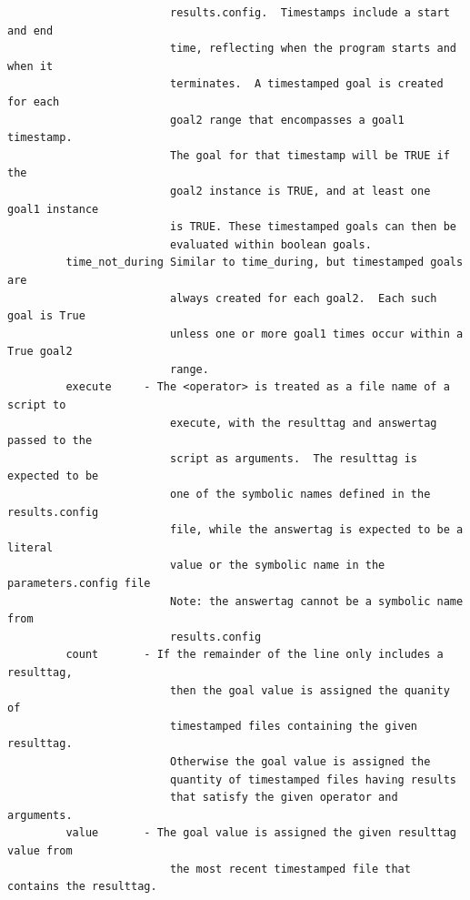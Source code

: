 \documentclass[12pt]{article}
\begin{document}
\begin{verbatim}
                         results.config.  Timestamps include a start and end 
                         time, reflecting when the program starts and when it 
                         terminates.  A timestamped goal is created for each
                         goal2 range that encompasses a goal1 timestamp.
                         The goal for that timestamp will be TRUE if the
                         goal2 instance is TRUE, and at least one goal1 instance
                         is TRUE. These timestamped goals can then be
                         evaluated within boolean goals.
         time_not_during Similar to time_during, but timestamped goals are
                         always created for each goal2.  Each such goal is True
                         unless one or more goal1 times occur within a True goal2
                         range.
         execute     - The <operator> is treated as a file name of a script to 
                         execute, with the resulttag and answertag passed to the 
                         script as arguments.  The resulttag is expected to be 
                         one of the symbolic names defined in the results.config 
                         file, while the answertag is expected to be a literal 
                         value or the symbolic name in the parameters.config file 
                         Note: the answertag cannot be a symbolic name from 
                         results.config 
         count       - If the remainder of the line only includes a resulttag,
                         then the goal value is assigned the quanity of 
                         timestamped files containing the given resulttag.  
                         Otherwise the goal value is assigned the
                         quantity of timestamped files having results
                         that satisfy the given operator and arguments.
         value       - The goal value is assigned the given resulttag value from
                         the most recent timestamped file that contains the resulttag.
 

\end{verbatim}
\end{document}
